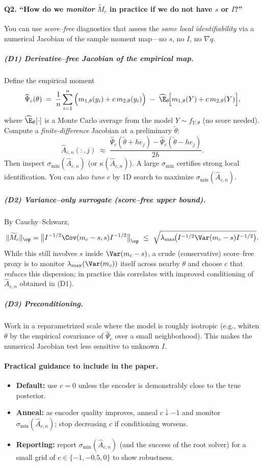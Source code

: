 \medskip
\paragraph{Q2. “How do we \emph{monitor} $\widetilde M_c$ in practice if we do not have $s$ or $I$?”}
You can use \emph{score–free} diagnostics that assess the \emph{same local identifiability} via a numerical Jacobian of the sample moment map—no $s$, no $I$, no $\nabla q$.

\subparagraph{(D1) Derivative–free Jacobian of the empirical map.}
Define the empirical moment
\[
\widehat\Psi_c(\theta)\;=\;\frac1n\sum_{i=1}^n \Big(m_{1,\theta}(y_i)+c\,m_{2,\theta}(y_i)\Big)\;-\;\widehat{\E}_\theta\!\Big[m_{1,\theta}(Y)+c\,m_{2,\theta}(Y)\Big],
\]
where $\widehat{\E}_\theta[\cdot]$ is a Monte Carlo average from the model $Y\sim f_{Y;\theta}$ (no score needed).
Compute a \emph{finite-difference} Jacobian at a preliminary $\tilde\theta$:
\[
\widehat A_{c,n}(:,j)\;\approx\;\frac{\widehat\Psi_c(\tilde\theta+h e_j)-\widehat\Psi_c(\tilde\theta-h e_j)}{2h}.
\]
Then inspect $\sigma_{\min}(\widehat A_{c,n})$ (or $\kappa(\widehat A_{c,n})$).  
A large $\sigma_{\min}$ certifies strong local identification.  
You can also \emph{tune} $c$ by 1D search to maximize $\sigma_{\min}(\widehat A_{c,n})$.

\subparagraph{(D2) Variance–only surrogate (score–free upper bound).}
By Cauchy–Schwarz,
\[
\|\widetilde M_c\|_{\op}
=\big\|I^{-1/2}\Cov(m_c-s,s)I^{-1/2}\big\|_{\op}
\ \le\ \sqrt{\lambda_{\max}\!\big(I^{-1/2}\Var(m_c-s)I^{-1/2}\big)}.
\]
While this still involves $s$ inside $\Var(m_c-s)$, a crude (conservative) score–free proxy is to monitor $\lambda_{\max}(\Var(m_c))$ itself across nearby $\theta$ and choose $c$ that \emph{reduces} this dispersion; in practice this correlates with improved conditioning of $\widehat A_{c,n}$ obtained in (D1).

\subparagraph{(D3) Preconditioning.}
Work in a reparametrized scale where the model is roughly isotropic (e.g., whiten $\theta$ by the empirical covariance of $\widehat\Psi_c$ over a small neighborhood). This makes the numerical Jacobian test less sensitive to unknown $I$.

\medskip
\paragraph{Practical guidance to include in the paper.}
\begin{itemize}
\item \textbf{Default:} use $c=0$ unless the encoder is demonstrably close to the true posterior.
\item \textbf{Anneal:} as encoder quality improves, anneal $c\downarrow -1$ and monitor $\sigma_{\min}(\widehat A_{c,n})$; stop decreasing $c$ if conditioning worsens.
\item \textbf{Reporting:} report $\sigma_{\min}(\widehat A_{c,n})$ (and the success of the root solver) for a small grid of $c\in\{-1,-0.5,0\}$ to show robustness.
\end{itemize}


